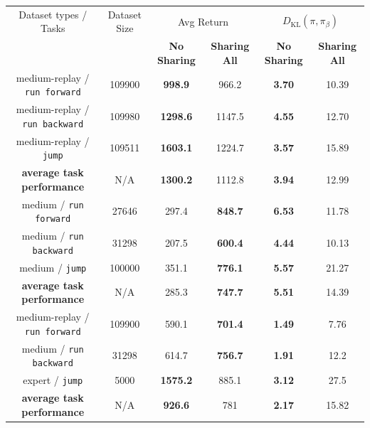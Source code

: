 \begin{table}[t]
\begin{tabularx}{0.75\linewidth}{cc|cc|cc}
  \toprule
 \multicolumn{1}{c}{\multirow{1.5}[2]{*}{Dataset types / Tasks}} & \multicolumn{1}{c}{\multirow{1.5}[2]{*}{Dataset Size}}\vline &
 \multicolumn{2}{c}{Avg Return}\vline & \multicolumn{2}{c}{$D_\text{KL}(\pi, \pi_\beta)$}\\
 & \multicolumn{1}{c}{}\vline & \multicolumn{1}{c}{\textbf{No Sharing}}  & \multicolumn{1}{c}{\textbf{Sharing All}}\vline  & \multicolumn{1}{c}{\textbf{No Sharing}}  & \multicolumn{1}{c}{\textbf{Sharing All}} \\
\midrule
  medium-replay / \texttt{run forward} & 109900 & \textbf{998.9} & 966.2 & \textbf{3.70} & 10.39\\
  medium-replay / \texttt{run backward} & 109980 & \textbf{1298.6} & 1147.5 & \textbf{4.55} & 12.70\\
  medium-replay / \texttt{jump} & 109511 & \textbf{1603.1} & 1224.7 & \textbf{3.57} & 15.89\\
  \rowcolor{Gray}
  \textbf{average task performance} & N/A & \textbf{1300.2} & 1112.8 & \textbf{3.94}  & 12.99\\
  \midrule
  medium / \texttt{run forward} & 27646 & 297.4  & \textbf{848.7} &\textbf{6.53} & 11.78\\
  medium / \texttt{run backward} & 31298 & 207.5 & \textbf{600.4}& \textbf{4.44} & 10.13\\
  medium / \texttt{jump} & 100000 & 351.1 & \textbf{776.1}& \textbf{5.57} & 21.27\\
\rowcolor{Gray}
  \textbf{average task performance} & N/A & 285.3 & \textbf{747.7} & \textbf{5.51} & 14.39 \\
  \midrule
  medium-replay / \texttt{run forward} & 109900 & 590.1 & \textbf{701.4}& \textbf{1.49} & 7.76\\
  medium / \texttt{run backward} & 31298 & 614.7 & \textbf{756.7}& \textbf{1.91} & 12.2\\
  \rowcolor{yellow}
  expert / \texttt{jump} & 5000 & \textbf{1575.2} & 885.1 & \textbf{3.12} & 27.5\\
\rowcolor{Gray}
  \textbf{average task performance} & N/A & \textbf{926.6} & 781 & \textbf{2.17}  & 15.82 \\
    \bottomrule
    \end{tabularx}
    \vspace{-0.1cm}

\end{table}
